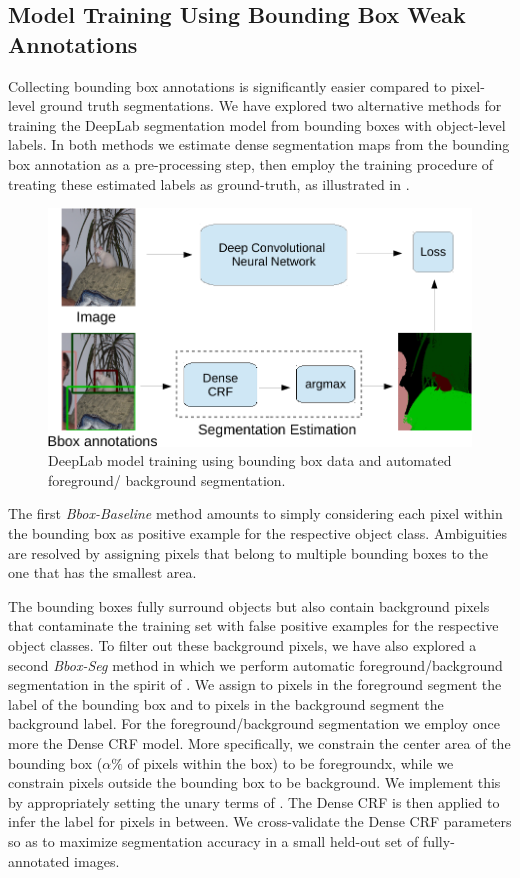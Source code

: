 \subsection{Model Training Using Bounding Box Weak Annotations}
\label{sec:train_bbox}

Collecting bounding box annotations is significantly easier compared
to pixel-level ground truth segmentations. We have explored two
alternative methods for training the DeepLab segmentation model from
bounding boxes with object-level labels. In both methods we estimate
dense segmentation maps from the bounding box annotation as a
pre-processing step, then employ the training procedure of
 treating these estimated labels as
ground-truth, as illustrated in .

\begin{figure}[htbp!]
  \centering
  \includegraphics[width=0.9\linewidth]{fig/model_train_bbox.pdf} 
  \caption{DeepLab model training using bounding box data and
    automated foreground/ background segmentation.}
  \label{fig:model_train_bbox}
\end{figure}

The first \textsl{Bbox-Baseline} method amounts to simply considering
each pixel within the bounding box as positive example for the
respective object class. Ambiguities are resolved by assigning pixels
that belong to multiple bounding boxes to the one that has the
smallest area.

The bounding boxes fully surround objects but also contain background
pixels that contaminate the training set with false positive examples
for the respective object classes. To filter out these background
pixels, we have also explored a second \textsl{Bbox-Seg} method in
which we perform automatic foreground/background segmentation in the
spirit of \citet{rother2004grabcut}. We assign to pixels in the
foreground segment the label of the bounding box and to pixels in the
background segment the background label. For the foreground/background
segmentation we employ once more the Dense CRF model. More
specifically, we constrain the center area of the bounding box
($\alpha\%$ of pixels within the box) to be foregroundx, while we
constrain pixels outside the bounding box to be background. We
implement this by appropriately setting the unary terms of
. The Dense CRF is then applied to infer the
label for pixels in between. We cross-validate the Dense CRF
parameters so as to maximize segmentation accuracy in a small held-out
set of fully-annotated images.

